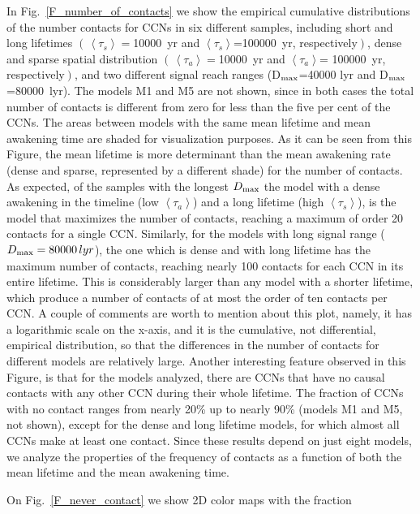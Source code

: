 \documentclass[crop]{CSLB}
\newcommand{\ceti}{CCN}
\newcommand{\cetis}{CCNs}
\newcommand{\ffn}[1]{}
\begin{document}
\ffn{3}
%
In Fig.~\ref{F_number_of_contacts} we show the empirical cumulative
distributions of the number contacts for \cetis{} in six different
samples, including short and long lifetimes
$\left(\,\left<\tau_s\right>=\right.$10000~yr and
$\left<\tau_s\right>$=100000~yr, respectively$\left.\right)$, dense
and sparse spatial distribution
$\left(\,\left<\tau_a\right>=\right.$10000~yr and
$\left<\tau_a\right>$= 100000~yr, respectively$\left.\right)$, and two
different signal reach ranges (D$_{\rm max}$=40000 lyr and
D$_{\rm max}$=80000~lyr).
%
The models M1 and M5 are not shown, since in both cases the total
number of contacts is different from zero for less than the five per
cent of the \cetis{}.
%
The areas between models with the same mean lifetime and mean
awakening time are shaded for visualization purposes.
%
As it can be seen from this Figure, the mean lifetime is more
determinant than the mean awakening rate (dense and sparse,
represented by a different shade) for the number of contacts.
%
As expected, of the samples with the longest $D_{\rm max}$ the model with
a dense awakening in the timeline (low $\left<\tau_a\right>$) and a
long lifetime (high $\left<\tau_s\right>$), is the model that
maximizes the number of contacts, reaching a maximum of order 20
contacts for a single \ceti{}.
%
Similarly, for the models with long signal range
($D_{\rm max}=80000\,lyr$), the one which is dense and with long lifetime
has the maximum number of contacts, reaching nearly 100 contacts for
each \ceti{} in its entire lifetime.
%
This is considerably larger than any model with a shorter lifetime,
which produce a number of contacts of at most the order of ten
contacts per \ceti{}.
%
A couple of comments are worth to mention about this plot, namely, it
has a logarithmic scale on the x-axis, and it is the cumulative, not
differential, empirical distribution, so that the differences in the
number of contacts for different models are relatively large.
%
Another interesting feature observed in this Figure, is that for the
models analyzed, there are \cetis{} that have no causal contacts with
any other \ceti{} during their whole lifetime.
%
The fraction of \cetis{} with no contact ranges from nearly 20\% up to
nearly 90\% (models M1 and M5, not shown), except for the dense and
long lifetime models, for which almost all \cetis{} make at least one
contact.
%
Since these results depend on just eight models, we analyze the
properties of the frequency of contacts as a function of both the mean
lifetime and the mean awakening time.
%
\ffn{4}
%
On Fig.~\ref{F_never_contact} we show 2D color maps with the fraction
\end{document}
